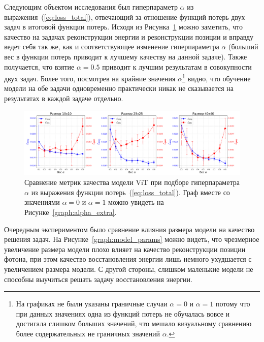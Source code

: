 \documentclass[a4paper,12pt]{extarticle}
\begin{document}
Следующим объектом исследования был гиперпараметр $\alpha$ из выражения~(\ref{eq:loss_total}), отвечающий за отношение функций потерь двух задач в итоговой функции потерь. Исходя из Рисунка~\ref{graph:alpha} можно заметить, что качество на задачах реконструкции энергии и реконструкции позиции и вправду ведет себя так же, как и соответствующее изменение гиперпараметра $\alpha$ (больший вес в функции потерь приводит к лучшему качеству на данной задаче). Также получается, что взятие $\alpha = 0.5$ приводит к лучшим результатам в совокупности двух задач. Более того, посмотрев на крайние значения $\alpha$\footnote{На графиках не были указаны граничные случаи $\alpha = 0$ и $\alpha = 1$ потому что при данных значениях одна из функций потерь не обучалась вовсе и достигала слишком больших значений, что мешало визуальному сравнению более содержательных не граничных значений $\alpha$.} видно, что обучение модели на обе задачи одновременно практически никак не сказывается на результатах в каждой задаче отдельно.

\begin{figure}[t]
    \centering
    \includegraphics[width=1.0\textwidth]{graphics/exp3_alpha_std.png}
    \caption{Сравнение метрик качества модели \textsf{ViT} при подборе гиперпараметра $\alpha$ из выражения функции потерь~(\ref{eq:loss_total}). Граф вместе со значениями $\alpha = 0$ и $\alpha = 1$ можно увидеть на Рисунке~\ref{graph:alpha_extra}.}
    \label{graph:alpha}
\end{figure}

Очередным экспериментом было сравнение влияния размера модели на качество решения задач. На Рисунке~\ref{graph:model_params} можно видеть, что чрезмерное увеличение размера модели плохо влияет на качество реконструкции позиции фотона, при этом качество восстановления энергии лишь немного ухудшается с увеличением размера модели. С другой стороны, слишком маленькие модели не способны выучиться решать задачу восстановления энергии.
\end{document}
